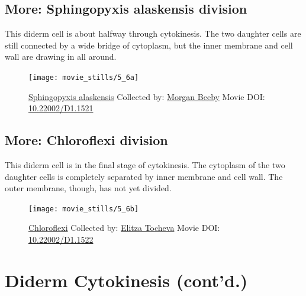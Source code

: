 \documentclass[]{tufte-book}
\begin{document}
\hypertarget{Sphingopyxis_alaskensis_division}{\subsection*{More:
Sphingopyxis alaskensis
division}\label{Sphingopyxis_alaskensis_division}}

This diderm cell is about halfway through cytokinesis. The two daughter
cells are still connected by a wide bridge of cytoplasm, but the inner
membrane and cell wall are drawing in all around.





\begin{figure}
\texttt{[image: movie\_stills/5\_6a]} \caption[\protect\hyperlink{tree}{Sphingopyxis alaskensis} Collected
by: \protect\hyperlink{morgan_beeby}{Morgan Beeby} Movie DOI:
\href{https://doi.org/10.22002/D1.1521}{10.22002/D1.1521}]{\protect\hyperlink{tree}{Sphingopyxis alaskensis} Collected
by: \protect\hyperlink{morgan_beeby}{Morgan Beeby} Movie DOI:
\href{https://doi.org/10.22002/D1.1521}{10.22002/D1.1521}}\label{fig:5-6a}
\end{figure}

\hypertarget{Chloroflexi_division}{\subsection*{More: Chloroflexi
division}\label{Chloroflexi_division}}

This diderm cell is in the final stage of cytokinesis. The cytoplasm of
the two daughter cells is completely separated by inner membrane and
cell wall. The outer membrane, though, has not yet divided.





\begin{figure}
\texttt{[image: movie\_stills/5\_6b]} \caption[\protect\hyperlink{tree}{Chloroflexi} Collected by:
\protect\hyperlink{elitza_tocheva}{Elitza Tocheva} Movie DOI:
\href{https://doi.org/10.22002/D1.1522}{10.22002/D1.1522}]{\protect\hyperlink{tree}{Chloroflexi} Collected by:
\protect\hyperlink{elitza_tocheva}{Elitza Tocheva} Movie DOI:
\href{https://doi.org/10.22002/D1.1522}{10.22002/D1.1522}}\label{fig:5-6b}
\end{figure}

\section{Diderm Cytokinesis (cont'd.)}\label{diderm-cytokinesis-contd.}
\end{document}
